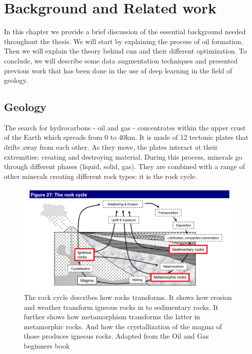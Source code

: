 \chapter{Background and Related work}
\label{chp:background}

In this chapter we provide a brief discussion of the essential background needed throughout the thesis. We will start by explaining the process of oil formation. Then we will explain the theory behind \gls{cnn} and their different optimization. To conclude, we will describe some data augmentation techniques and presented previous work that has been done in the use of deep learning in the field of geology.


\section{Geology}
The search for hydrocarbons - oil and gas - concentrates within the upper crust of the Earth which spreads from 0 to 40km. It is made of 12 tectonic plates that drifts away from each other. As they move, the plates interact at their extremities: creating and destroying material. During this process, minerals go through different phases (liquid, solid, gas). They are combined with a range of other minerals creating different rock types: it is the rock cycle. 
	\begin{figure}[!htp]
    \centering
        \includegraphics[width=1\textwidth]{figures/02-rock-cycle}
        \caption[The rock cycle]{The rock cycle describes how rocks transforms. It shows how erosion and weather transform igneous rocks in to sedimentary rocks. It further shows how metamorphism transforms the latter in metamorphic rocks. And how the crystallization of the magma of those produces igneous rocks. Adapted from the Oil and Gas beginners book \cite{oilbegin} }\label{fig:rock-cycle}
    \end{figure}

